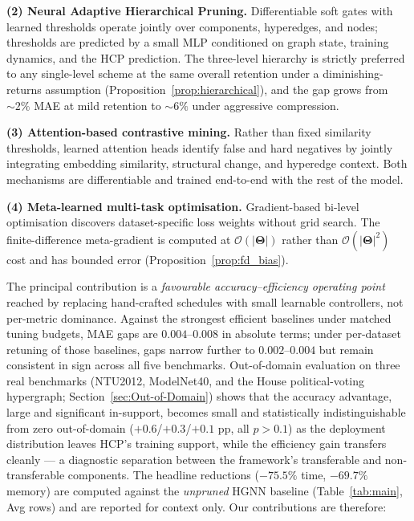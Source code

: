 \documentclass[10pt]{article}
\theoremstyle{plain}
\theoremstyle{definition}
\begin{document}
\textbf{(2) Neural Adaptive Hierarchical Pruning.} Differentiable soft gates with learned thresholds operate jointly over components, hyperedges, and nodes; thresholds are predicted by a small MLP conditioned on graph state, training dynamics, and the HCP prediction. The three-level hierarchy is strictly preferred to any single-level scheme at the same overall retention under a diminishing-returns assumption (Proposition~\ref{prop:hierarchical}), and the gap grows from $\sim\!2\%$ MAE at mild retention to $\sim\!6\%$ under aggressive compression.

\textbf{(3) Attention-based contrastive mining.} Rather than fixed similarity thresholds, learned attention heads identify false and hard negatives by jointly integrating embedding similarity, structural change, and hyperedge context. Both mechanisms are differentiable and trained end-to-end with the rest of the model.

\textbf{(4) Meta-learned multi-task optimisation.} Gradient-based bi-level optimisation discovers dataset-specific loss weights without grid search. The finite-difference meta-gradient is computed at $\mathcal{O}(|\boldsymbol{\Theta}|)$ rather than $\mathcal{O}(|\boldsymbol{\Theta}|^{2})$ cost and has bounded error (Proposition~\ref{prop:fd_bias}).

The principal contribution is a \emph{favourable accuracy--efficiency operating point} reached by replacing hand-crafted schedules with small learnable controllers, not per-metric dominance. Against the strongest efficient baselines under matched tuning budgets, MAE gaps are $0.004$--$0.008$ in absolute terms; under per-dataset retuning of those baselines, gaps narrow further to $0.002$--$0.004$ but remain consistent in sign across all five benchmarks. Out-of-domain evaluation on three real benchmarks (NTU2012, ModelNet40, and the House political-voting hypergraph; Section~\ref{sec:Out-of-Domain}) shows that the accuracy advantage, large and significant in-support, becomes small and statistically indistinguishable from zero out-of-domain ($+0.6$/$+0.3$/$+0.1$ pp, all $p>0.1$) as the deployment distribution leaves HCP's training support, while the efficiency gain transfers cleanly --- a diagnostic separation between the framework's transferable and non-transferable components. The headline reductions ($-75.5\%$ time, $-69.7\%$ memory) are computed against the \emph{unpruned} HGNN baseline (Table~\ref{tab:main}, Avg rows) and are reported for context only. Our contributions are therefore:
\end{document}
